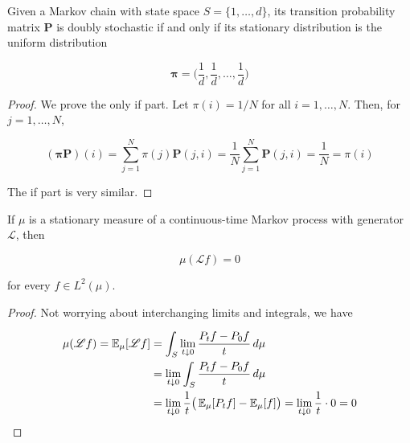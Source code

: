 	\begin{theorem}
		\label{thm:transition-matrix-of-a-finite-chain}
		Given a Markov chain with state space $S = \{1, \ldots, d\}$, its transition probability matrix $\mathbf{P}$ is doubly stochastic if and only if its stationary distribution is the uniform distribution 

			\begin{equation}
				\boldsymbol{\pi} = \bigg( \frac{1}{d}, \frac{1}{d}, \ldots, \frac{1}{d} \bigg)
			\end{equation}
	\end{theorem}
	\begin{proof}
		We prove the only if part. Let $\pi(i) = 1/N$ for all $i = 1, \ldots, N$. Then, for $j = 1, \ldots, N$, 

			\begin{equation}
				(\boldsymbol{\pi} \mathbf{P}) (i) = \sum_{j=1}^N \pi(j) \mathbf{P}(j, i) = \frac{1}{N} \sum_{j=1}^N \mathbf{P}(j, i) = \frac{1}{N} = \pi(i)
			\end{equation}

		The if part is very similar. 
	\end{proof}


	\begin{theorem}
		\label{thm:stationary-measures-and-the-generator}
		If $\mu$ is a stationary measure of a continuous-time Markov process with generator $\mathscr{L}$, then 

			\begin{equation}
				\mu(\mathscr{L} f) = 0
			\end{equation}

		for every $f \in L^2 (\mu)$. 
	\end{theorem}
	\begin{proof}
		Not worrying about interchanging limits and integrals, we have 

		\begin{align*}
			\mu(\mathscr{L} f) = \operatorname{\mathbb{E}}_\mu [\mathscr{L} f] & = \int_S \lim_{t \downarrow 0} \frac{P_t f - P_0 f}{t} \,d\mu \\ 
			& = \lim_{t \downarrow 0} \int_S \frac{P_t f - P_0 f}{t} \,d\mu \\
			& = \lim_{t \downarrow 0} \frac{1}{t} \big( \operatorname{\mathbb{E}}_\mu [P_t f] - \operatorname{\mathbb{E}}_\mu [f] \big) = \lim_{t \downarrow 0} \frac{1}{t} \cdot 0 = 0 
		\end{align*}
	\end{proof}


